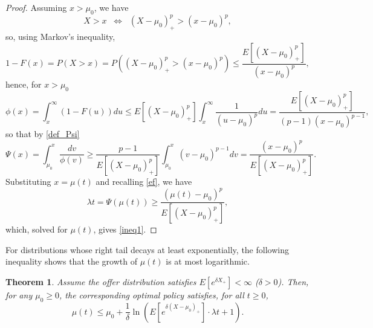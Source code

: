 \documentclass{article}
\newtheorem{thm}{Theorem}[section]
\numberwithin{equation}{section}
\begin{document}
	\begin{proof} Assuming $x>\mu_0$, we have
		$$X>x \;\;\Leftrightarrow  \;\;(X-\mu_0)_+^p>(x-\mu_0)^p,$$	
		so, using Markov's inequality,
		$$1-F(x)=P(X>x)=P((X-\mu_0)_+^p>(x-\mu_0)^p)\leq \frac{E[(X-\mu_0)_+^p]}{(x-\mu_0)^p},$$
		hence, for $x>\mu_0$
		$$\phi(x)=\int_x^\infty (1-F(u))du\leq E[(X-\mu_0)_+^p]\int_{x}^\infty \frac{1}{(u-\mu_0)^p}du= \frac{E[(X-\mu_0)_+^p]}{(p-1)(x-\mu_0)^{p-1}},$$
		so that by \eqref{def_Psi}
		$$\Psi(x)=\int_{\mu_0}^{x}\frac{dv}{\phi(v)}\geq \frac{p-1}{E[(X-\mu_0)_+^p]}\int_{\mu_0}^x (v-\mu_0)^{p-1} dv= \frac{(x-\mu_0)^p}{E[(X-\mu_0)_+^p]}.$$
		Substituting $x=\mu(t)$ and recalling \eqref{ef},
		we have
		$$\lambda t=\Psi(\mu(t))\geq \frac{(\mu(t)-\mu_0)^p}{E[(X-\mu_0)_+^p]},$$
		which, solved for $\mu(t)$, gives \eqref{ineq1}.
	\end{proof}
	
	
	
	
	For distributions whose right tail decays at least exponentially, the following inequality shows that the growth of 
	$\mu(t)$ is at most logarithmic.
	
	\begin{thm} Assume the offer distribution satisfies $E[e^{\delta X_+}]<\infty$ ($\delta>0$). Then, for any $\mu_0\geq 0$, the corresponding optimal policy satisfies, for all $t\geq 0$,
		\begin{equation}\label{ineq2}\mu(t)\leq \mu_0+ \frac{1}{\delta}\ln\left(E[e^{\delta (X-\mu_0)_+}]\cdot \lambda t+1 \right).\end{equation}
	\end{thm}
	
\end{document}
